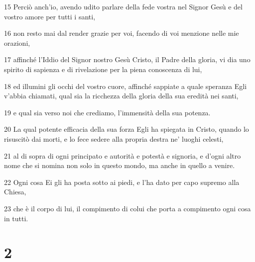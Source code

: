 \par 15 Perciò anch'io, avendo udito parlare della fede vostra nel Signor Gesù e del vostro amore per tutti i santi,
\par 16 non resto mai dal render grazie per voi, facendo di voi menzione nelle mie orazioni,
\par 17 affinché l'Iddio del Signor nostro Gesù Cristo, il Padre della gloria, vi dia uno spirito di sapienza e di rivelazione per la piena conoscenza di lui,
\par 18 ed illumini gli occhi del vostro cuore, affinché sappiate a quale speranza Egli v'abbia chiamati, qual sia la ricchezza della gloria della sua eredità nei santi,
\par 19 e qual sia verso noi che crediamo, l'immensità della sua potenza.
\par 20 La qual potente efficacia della sua forza Egli ha spiegata in Cristo, quando lo risuscitò dai morti, e lo fece sedere alla propria destra ne' luoghi celesti,
\par 21 al di sopra di ogni principato e autorità e potestà e signoria, e d'ogni altro nome che si nomina non solo in questo mondo, ma anche in quello a venire.
\par 22 Ogni cosa Ei gli ha posta sotto ai piedi, e l'ha dato per capo supremo alla Chiesa,
\par 23 che è il corpo di lui, il compimento di colui che porta a compimento ogni cosa in tutti.

\chapter{2}

